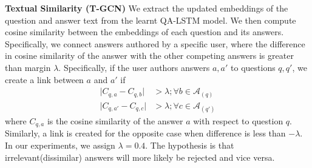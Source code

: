 \documentclass[smallcondensed]{svjour3}     %
\begin{document}
\textbf{Textual Similarity (T-GCN)} We extract the updated embeddings of the question and answer text from the learnt QA-LSTM model. We then compute cosine similarity between the embeddings of each question and its answers.
Specifically, we connect answers authored by a specific user, where the difference in cosine similarity of the answer with the other competing answers is greater than margin $\lambda$. Specifically, if the user authors answers $a, a'$ to questions $q, q'$, we create a link between $a$ and $a'$ if %
\begin{align*}
 \lvert C_{q,a} - C_{q, b} \rvert &> \lambda; \forall b \in \mathcal{A}_(q) \\
 \lvert C_{q,a'} - C_{q, c} \rvert &> \lambda; \forall c \in \mathcal{A}_(q')
\end{align*}
where $C_{q,a}$ is the cosine similarity of the answer $a$ with respect to question $q$. Similarly, a link is created for the opposite case when difference is less than $-\lambda$. In our experiments, we assign $\lambda = 0.4$. The hypothesis is that irrelevant(dissimilar) answers will more likely be rejected and vice versa.
\end{document}
